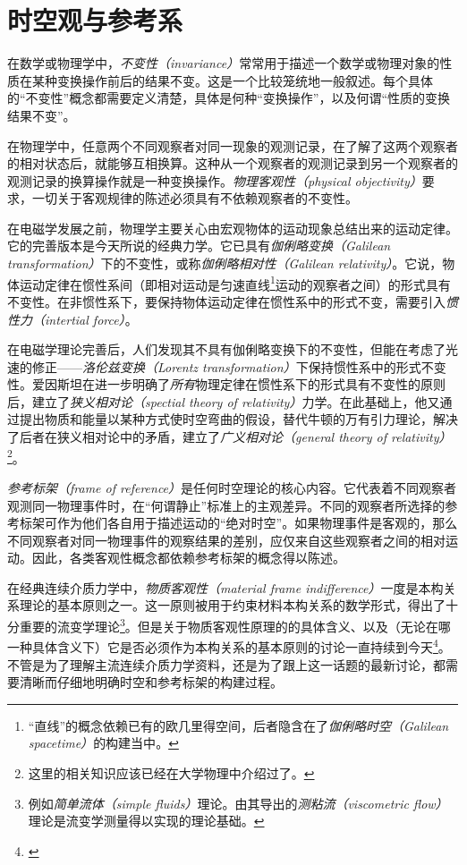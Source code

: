 \documentclass[
  zihao=5,
  a4paper,
  heading=true,
  twoside
]{ctexbook}
\theoremstyle{definition}
\theoremstyle{plain}
\begin{document}
\chapter{时空观与参考系}\label{sec:III.1}
在数学或物理学中，\emph{不变性（invariance）}常常用于描述一个数学或物理对象的性质在某种变换操作前后的结果不变。这是一个比较笼统地一般叙述。每个具体的“不变性”概念都需要定义清楚，具体是何种“变换操作”，以及何谓“性质的变换结果不变”。

在物理学中，任意两个不同观察者对同一现象的观测记录，在了解了这两个观察者的相对状态后，就能够互相换算。这种从一个观察者的观测记录到另一个观察者的观测记录的换算操作就是一种变换操作。\emph{物理客观性（physical objectivity）}要求，一切关于客观规律的陈述必须具有不依赖观察者的不变性。

在电磁学发展之前，物理学主要关心由宏观物体的运动现象总结出来的运动定律。它的完善版本是今天所说的经典力学。它已具有\emph{伽俐略变换（Galilean transformation）}下的不变性，或称\emph{伽俐略相对性（Galilean relativity）}。它说，物体运动定律在惯性系间（即相对运动是匀速直线\footnote{“直线”的概念依赖已有的欧几里得空间，后者隐含在了\emph{伽俐略时空（Galilean spacetime）}的构建当中\cite{Weatherall2022}。}运动的观察者之间）的形式具有不变性。在非惯性系下，要保持物体运动定律在惯性系中的形式不变，需要引入\emph{惯性力（intertial force）}。

在电磁学理论完善后，人们发现其不具有伽俐略变换下的不变性，但能在考虑了光速的修正——\emph{洛伦兹变换（Lorentz transformation）}下保持惯性系中的形式不变性。爱因斯坦在进一步明确了\emph{所有}物理定律在惯性系下的形式具有不变性的原则后，建立了\emph{狭义相对论（spectial theory of relativity）}力学。在此基础上，他又通过提出物质和能量以某种方式使时空弯曲的假设，替代牛顿的万有引力理论，解决了后者在狭义相对论中的矛盾，建立了\emph{广义相对论（general theory of  relativity）}\footnote{这里的相关知识应该已经在大学物理中介绍过了\cite[\S 1,\S 2.5]{邓文基2009大物上}\cite[\S 24]{邓文基2009大物下}。}。

\emph{参考标架（frame of reference）}是任何时空理论的核心内容。它代表着不同观察者观测同一物理事件时，在“何谓静止”标准上的主观差异。不同的观察者所选择的参考标架可作为他们各自用于描述运动的“绝对时空”。如果物理事件是客观的，那么不同观察者对同一物理事件的观察结果的差别，应仅来自这些观察者之间的相对运动。因此，各类客观性概念都依赖参考标架的概念得以陈述。

在经典连续介质力学中，\emph{物质客观性（material frame indifference）}一度是本构关系理论的基本原则之一\cite[Sect.293]{Truesdell1960}\cite[Sect.19]{Truesdell2004}。这一原则被用于约束材料本构关系的数学形式，得出了十分重要的流变学理论\footnote{例如\emph{简单流体（simple fluids）}理论\cite{Noll1958}。由其导出的\emph{测粘流（viscometric flow）}理论是流变学测量得以实现的理论基础\cite{Coleman1966}\cite{Walters1975}。}。但是关于物质客观性原理的的具体含义、以及（无论在哪一种具体含义下）它是否必须作为本构关系的基本原则的讨论一直持续到今天\footnote{\cite{Gennes1983}\cite{Frewer2009}}。不管是为了理解主流连续介质力学资料，还是为了跟上这一话题的最新讨论，都需要清晰而仔细地明确时空和参考标架的构建过程。
\end{document}
